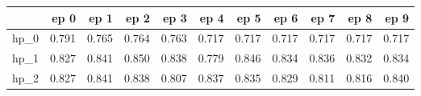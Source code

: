 \begin{tabular}{lrrrrrrrrrr}
\toprule
{} &   ep 0 &   ep 1 &   ep 2 &   ep 3 &   ep 4 &   ep 5 &   ep 6 &   ep 7 &   ep 8 &   ep 9 \\
\midrule
hp\_0 &  0.791 &  0.765 &  0.764 &  0.763 &  0.717 &  0.717 &  0.717 &  0.717 &  0.717 &  0.717 \\
hp\_1 &  0.827 &  0.841 &  0.850 &  0.838 &  0.779 &  0.846 &  0.834 &  0.836 &  0.832 &  0.834 \\
hp\_2 &  0.827 &  0.841 &  0.838 &  0.807 &  0.837 &  0.835 &  0.829 &  0.811 &  0.816 &  0.840 \\
\bottomrule
\end{tabular}

